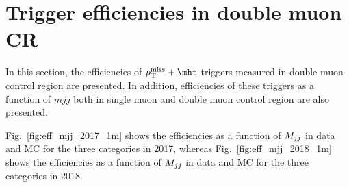 \section{Trigger efficiencies in double muon CR}
\label{sec:more_trigger}

In this section, the efficiencies of $\ptmiss+\mht$ triggers measured in double muon control region are presented. 
In addition, efficiencies of these triggers as a function of $mjj$ both in single muon and double muon control region are also presented.

Fig.~\ref{fig:eff_mjj_2017_1m} shows the efficiencies as a function of $M_{jj}$ in data and MC for the three categories in 2017, 
whereas Fig.~\ref{fig:eff_mjj_2018_1m} shows the efficiencies as a function of $M_{jj}$ in data and MC for the three categories in 2018. 

